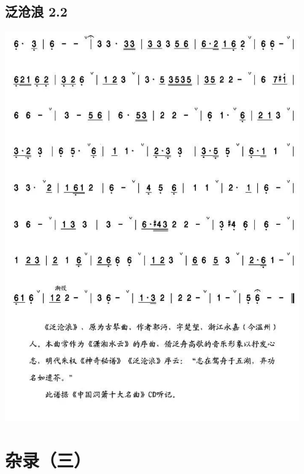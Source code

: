 \documentclass[cn,pad,twocol]{elegantbook}
\begin{document}
\section{泛沧浪 2.2}\includegraphics[width=0.95\textwidth]{dongxiao/20200819/泛沧浪-2.jpeg}

\chapter{杂录（三）}
\end{document}
